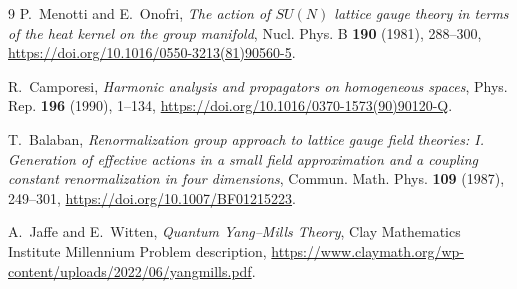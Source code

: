 \documentclass[11pt]{article}
\theoremstyle{definition}
\begin{document}
\begin{thebibliography}{9}
P.~Menotti and E.~Onofri,
\emph{The action of $SU(N)$ lattice gauge theory in terms of the heat kernel on
the group manifold},
Nucl. Phys. B \textbf{190} (1981), 288--300,
\url{https://doi.org/10.1016/0550-3213(81)90560-5}.

R.~Camporesi,
\emph{Harmonic analysis and propagators on homogeneous spaces},
Phys. Rep. \textbf{196} (1990), 1--134,
\url{https://doi.org/10.1016/0370-1573(90)90120-Q}.

T.~Balaban,
\emph{Renormalization group approach to lattice gauge field theories: I.
Generation of effective actions in a small field approximation and a coupling
constant renormalization in four dimensions},
Commun. Math. Phys. \textbf{109} (1987), 249--301,
\url{https://doi.org/10.1007/BF01215223}.

A.~Jaffe and E.~Witten,
\emph{Quantum Yang--Mills Theory}, Clay Mathematics Institute Millennium
Problem description,
\url{https://www.claymath.org/wp-content/uploads/2022/06/yangmills.pdf}.
\end{thebibliography}
\end{document}
